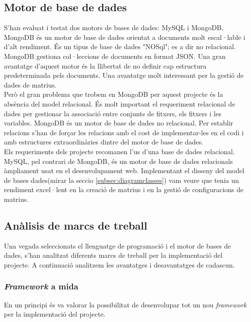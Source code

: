 \subsection{Motor de base de dades}
S'han evaluat i testat dos motors de bases de dades: MySQL i MongoDB.\\

MongoDB \'{e}s un motor de base de dades orientat a documents molt escal·lable i d'alt rendiment. \'{E}s un tipus de base de dades "NOSql"; es a dir no relacional. MongoDB gestiona col·leccions de documents en format JSON.\cite{apijson} Una gran avantatge d'aquest motor \'{e}s la llibertat de no definir cap estructura predeterminada pels documents. Una avantatge molt interessant per la gestió de dades de matrius.\cite{mongodb}\\

Però el gran problema que trobem en MongoDB per aquest projecte \'{e}s la absència del model relacional. \'{E}s molt important el requeriment relacional de dades per gestionar la associació entre conjunts de fitxers, els fitxers i les variables. MongoDB \'{e}s un motor de base de dades no relacional. Per establir relacions s'han de forçar les relacions amb el cost de implementar-les en el codi i amb estructures extraordinàries dintre del motor de base de dades.\\

Els requeriments dels projecte recomanen l'us d'una base de dades relacional. MySQL, pel contrari de MongoDB, \'{e}s un motor de base de dades relacionals àmpliament usat en el desenvolupament web. Implementant el disseny del model de bases dades(mirar la seccio \ref{subsec:diagramclasses}) vam veure que tenia un rendiment excel·lent en la creació de matrius i en la gestió de configuracions de matrius.

\subsection{Anàlisis de marcs de treball}
Una vegada seleccionats el llenguatge de programació i el motor de bases de dades, s'han analitzat diferents marcs de treball per la implementació del projecte. A continuació analitzem les avantatges i desavantatges de cadascun.

\subsubsection{\textit{Framework} a mida}
En un principi \'{e}s va valorar la possibilitat de desenvolupar tot un nou \textit{framework} per la implementaci\'{o} del projecte.\\

